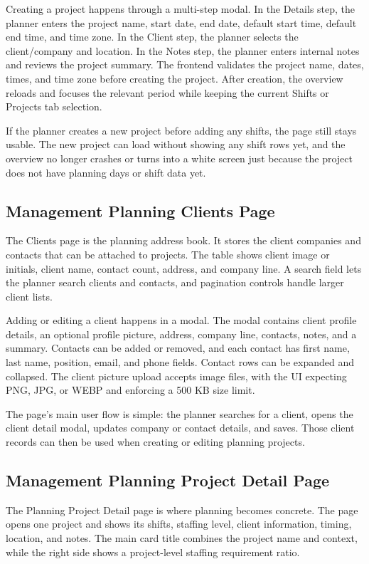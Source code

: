 \documentclass[11pt]{article}
\begin{document}
Creating a project happens through a multi-step modal. In the Details step, the planner enters the project name, start date, end date, default start time, default end time, and time zone. In the Client step, the planner selects the client/company and location. In the Notes step, the planner enters internal notes and reviews the project summary. The frontend validates the project name, dates, times, and time zone before creating the project. After creation, the overview reloads and focuses the relevant period while keeping the current Shifts or Projects tab selection.

If the planner creates a new project before adding any shifts, the page still stays usable. The new project can load without showing any shift rows yet, and the overview no longer crashes or turns into a white screen just because the project does not have planning days or shift data yet.

\subsection{Management Planning Clients Page}

The Clients page is the planning address book. It stores the client companies and contacts that can be attached to projects. The table shows client image or initials, client name, contact count, address, and company line. A search field lets the planner search clients and contacts, and pagination controls handle larger client lists.

Adding or editing a client happens in a modal. The modal contains client profile details, an optional profile picture, address, company line, contacts, notes, and a summary. Contacts can be added or removed, and each contact has first name, last name, position, email, and phone fields. Contact rows can be expanded and collapsed. The client picture upload accepts image files, with the UI expecting PNG, JPG, or WEBP and enforcing a 500 KB size limit.

The page's main user flow is simple: the planner searches for a client, opens the client detail modal, updates company or contact details, and saves. Those client records can then be used when creating or editing planning projects.

\subsection{Management Planning Project Detail Page}

The Planning Project Detail page is where planning becomes concrete. The page opens one project and shows its shifts, staffing level, client information, timing, location, and notes. The main card title combines the project name and context, while the right side shows a project-level staffing requirement ratio.
\end{document}
